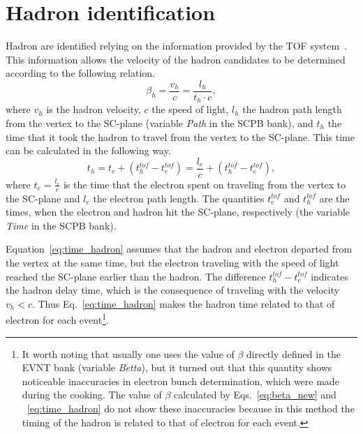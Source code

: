 \section{Hadron identification}
\label{Sect:hadr_id}
Hadron are identified relying on the information provided by the TOF system~\cite{Smith:1999ii, clas_tof_paddles}. This information allows the velocity of the hadron candidates to be determined according to the following relation.
\begin{equation}
\beta_{h} =\frac{v_{h}}{c}=\frac{l_{h}}{t_{h}\cdot c},
\label{eq:beta_new}
\end{equation}
where $v_{h}$ is the hadron velocity, $c$ the speed of light, $l_{h}$ the hadron path length from the vertex to the SC-plane (variable \textit{Path} in the SCPB bank), and $t_{h}$ the time that it took the hadron to travel from the vertex to the SC-plane. This time can be calculated in the following way. 
\begin{equation}
t_{h} = t_{e} + (t^{tof}_{h}- t^{tof}_{e}) = \frac{l_{e}}{c} + (t^{tof}_{h}- t^{tof}_{e})  ,
\label{eq:time_hadron}
\end{equation}
where $t_{e} = \frac{l_{e}}{c}$ is the time that the electron spent on traveling from the vertex to the SC-plane and $l_{e}$ the electron path length. The quantities $t^{tof}_{e}$ and $t^{tof}_{h}$ are the times, when the electron and hadron hit the SC-plane, respectively (the variable \textit{Time} in the SCPB bank).

Equation~\eqref{eq:time_hadron} assumes that the hadron and electron departed from the vertex at the same time, but the electron traveling with the speed of light reached the SC-plane earlier than the hadron. The difference $t^{tof}_{h} - t^{tof}_{e}$ indicates the hadron delay time, which is the consequence of traveling with the velocity $v_{h}<c$. Thus Eq.~\eqref{eq:time_hadron} makes the hadron time related to that of electron for each event\footnote[4]{It worth noting that usually one uses the value of $\beta$ directly defined in the EVNT bank (variable \textit{Betta}), but it turned out that this quantity shows noticeable inaccuracies in electron bunch determination, which were made during the cooking. The value of $\beta$ calculated by Eqs.~\eqref{eq:beta_new} and ~\eqref{eq:time_hadron} do not show these inaccuracies because in this method the timing of the hadron is related to that of electron for each event. }.  

